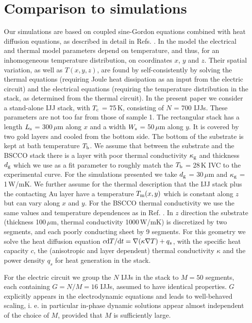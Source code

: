 \documentclass[aps,twocolumn,prb,showpacs,preprintnumbers,superscriptaddress,amsmath,amssymb,longbibliography]{revtex4-1}
\begin{document}
\section{Comparison to simulations}
\label{sec:simulations}
Our simulations are based on coupled sine-Gordon equations combined with heat diffusion equations, as described in detail in Refs. . 
In the model the electrical and thermal model parameters depend on temperature, and thus, for an inhomogeneous temperature distribution, on coordinates $x$, $y$ and $z$. Their spatial variation, as well as $T(x,y,z)$, are found by self-consistently by solving the thermal equations (requiring Joule heat dissipation as an input from the electric circuit) and the electrical equations (requiring the temperature distribution in the stack, as determined from the thermal circuit).
%
In the present paper we consider a stand-alone IJJ stack, with $T_{\rm c}$ = 75\,K, consisting of $N$ = 700 IJJs. These parameters are not too far from those of sample 1. The rectangular stack has a length $L_{\rm s}$ = 300\,$\mu$m along $x$ and a width $W_{\rm s}$ = 50\,$\mu$m along $y$. It is covered by two gold layers and cooled from the bottom side. The bottom of the substrate is kept at bath temperature $T_{\rm b}$. We assume that between the substrate and the BSCCO stack there is a layer with poor thermal conductivity $\kappa_{\rm g}$ and thickness $d_{\rm g}$ which we use as a fit parameter to roughly match the $T_{\rm b}$ = 28\,K IVC to the experimental curve. For the simulations presented we take $d_{\rm g}$ = 30\,$\mu$m and $\kappa_{\rm g}$ = 1\,W/mK.
We further assume for the thermal description that the IJJ stack plus the contacting Au layer have a temperature $T_{\rm m}(x,y)$ which is constant along $z$ but can vary along $x$ and $y$. For the BSCCO thermal conductivity we use the same values and temperature dependences as in Ref. . 
In $z$ direction the substrate (thickness 100\,$\mu$m, thermal conductivity 1000\,W/mK) is discretized by two segments, and each poorly conducting sheet by 9 segments.
%
For this geometry we solve the heat diffusion equation $c{\rm d}T/{\rm d}t=\nabla(\kappa\nabla T)+q_s$, 
with the specific heat capacity $c$, the (anisotropic and layer dependent) thermal conductivity $\kappa$ and the power density $q_s$  for heat generation in the stack.

For the electric circuit we group the $N$ IJJs in the stack to $M = 50$ segments, each containing $G = N/M = 16$ IJJs, assumed to have identical properties. $G$ explicitly appears in the electrodynamic equations and leads to well-behaved scaling, i. e. in particular in-phase dynamic solutions appear almost independent of the choice of $M$, provided that $M$ is sufficiently large. 
 
\end{document}
